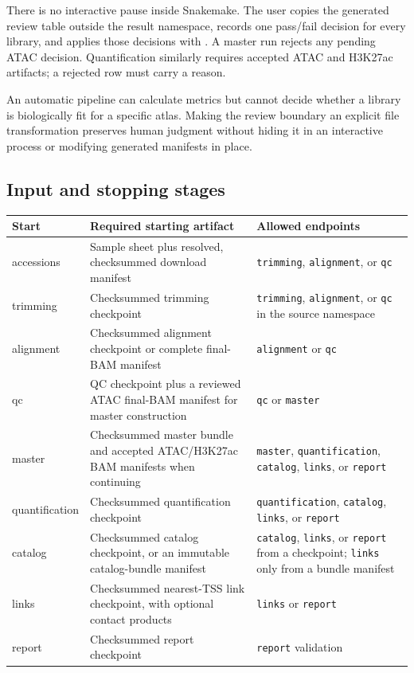 \documentclass[11pt]{article}
\newcommand{\stage}[1]{\texttt{#1}}
\newcommand{\filep}[1]{\path{#1}}
\begin{document}
There is no interactive pause inside Snakemake.  The user copies the generated
review table outside the result namespace, records one pass/fail decision for
every library, and applies those decisions with
\filep{src/review_final_bam_manifest.py}.  A master run rejects any pending
ATAC decision.  Quantification similarly requires accepted ATAC and H3K27ac
artifacts; a rejected row must carry a reason.

An automatic pipeline can calculate metrics but cannot decide whether a
library is biologically fit for a specific atlas.  Making the review boundary
an explicit file transformation preserves human judgment without hiding it in
an interactive process or modifying generated manifests in place.

\subsection{Input and stopping stages}

\begin{longtable}{>{\ttfamily}p{} p{} p{}}
\toprule
\normalfont Start & Required starting artifact & Allowed endpoints \\
\midrule
\endhead
accessions & Sample sheet plus resolved, checksummed download manifest &
\stage{trimming}, \stage{alignment}, or \stage{qc} \\
trimming & Checksummed trimming checkpoint &
\stage{trimming}, \stage{alignment}, or \stage{qc} in the source namespace \\
alignment & Checksummed alignment checkpoint or complete final-BAM manifest &
\stage{alignment} or \stage{qc} \\
qc & QC checkpoint plus a reviewed ATAC final-BAM manifest for master construction &
\stage{qc} or \stage{master} \\
master & Checksummed master bundle and accepted ATAC/H3K27ac BAM manifests when continuing &
\stage{master}, \stage{quantification}, \stage{catalog}, \stage{links}, or \stage{report} \\
quantification & Checksummed quantification checkpoint &
\stage{quantification}, \stage{catalog}, \stage{links}, or \stage{report} \\
catalog & Checksummed catalog checkpoint, or an immutable catalog-bundle manifest &
\stage{catalog}, \stage{links}, or \stage{report} from a checkpoint; \stage{links} only from a bundle manifest \\
links & Checksummed nearest-TSS link checkpoint, with optional contact products & \stage{links} or \stage{report} \\
report & Checksummed report checkpoint & \stage{report} validation \\
\bottomrule
\end{longtable}
\end{document}
